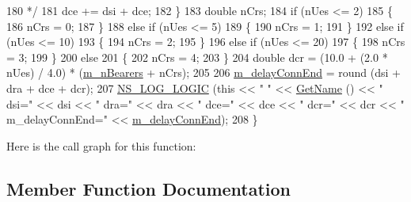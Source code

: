 \begin{DoxyCode}
180 \textcolor{comment}{       */}
181       dce += dsi + dce;
182     \}
183   \textcolor{keywordtype}{double} nCrs;
184   \textcolor{keywordflow}{if} (nUes <= 2)
185     \{
186       nCrs = 0;
187     \}
188   \textcolor{keywordflow}{else} \textcolor{keywordflow}{if} (nUes <= 5)
189     \{
190       nCrs = 1;
191     \}
192   \textcolor{keywordflow}{else} \textcolor{keywordflow}{if} (nUes <= 10)
193     \{
194       nCrs = 2;
195     \}
196   \textcolor{keywordflow}{else} \textcolor{keywordflow}{if} (nUes <= 20)
197     \{
198       nCrs = 3;
199     \}
200   \textcolor{keywordflow}{else}
201     \{
202       nCrs = 4;
203     \}
204   \textcolor{keywordtype}{double} dcr =  (10.0 + (2.0 * nUes) / 4.0) * (\hyperlink{classLteRrcConnectionEstablishmentTestCase_aed8d1feb0c1b557cd6685b17f3fa39f9}{m\_nBearers} + nCrs);
205 
206   \hyperlink{classLteRrcConnectionEstablishmentTestCase_a771ecf605e8f8cdf7a32d7d822946364}{m\_delayConnEnd} = round (dsi + dra + dce + dcr);
207   \hyperlink{group__logging_ga88acd260151caf2db9c0fc84997f45ce}{NS\_LOG\_LOGIC} (\textcolor{keyword}{this} << \textcolor{stringliteral}{" "} << \hyperlink{classns3_1_1TestCase_a28f7bb59669c24dae1c290fc17fc9b62}{GetName} () << \textcolor{stringliteral}{" dsi="} << dsi << \textcolor{stringliteral}{" dra="} << dra << \textcolor{stringliteral}{" dce="}
       << dce << \textcolor{stringliteral}{" dcr="} << dcr << \textcolor{stringliteral}{" m\_delayConnEnd="} << \hyperlink{classLteRrcConnectionEstablishmentTestCase_a771ecf605e8f8cdf7a32d7d822946364}{m\_delayConnEnd});
208 \}
\end{DoxyCode}


Here is the call graph for this function\+:




\subsection{Member Function Documentation}
